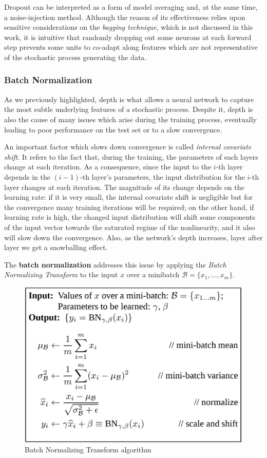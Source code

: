 \documentclass[a4paper, twoside]{article}
\begin{document}
        Dropout can be interpreted as a form of model averaging and, at the same time, a noise-injection method. Although the reason of its effectiveness relies upon sensitive considerations on the \textit{bagging technique}, which is not discussed in this work, it is intuitive that randomly dropping out some neurons at each forward step prevents some units to co-adapt along features which are not representative of the stochastic process generating the data.


        \subsubsection{Batch Normalization}

        As we previously highlighted, depth is what allows a neural network to capture the most subtle underlying features of a stochastic process. Despite it, depth is also the cause of many issues which arise during the training process, eventually leading to poor performance on the test set or to a slow convergence.

        An important factor which slows down convergence is called \textit{internal covariate shift}. It refers to the fact that, during the training, the parameters of each layers change at each iteration. As a consequence, since the input to the $i$-th layer depends in the $(i-1)$-th layer's parameters, the input distribution for the $i$-th layer changes at each iteration. The magnitude of its change depends on the learning rate: if it is very small, the internal covariate shift is negligible but for the convergence many training iterations will be required; on the other hand, if learning rate is high, the changed input distribution will shift some components of the input vector towards the saturated regime of the nonlinearity, and it also will slow down the convergence. Also, as the network's depth increases, layer after layer we get a snowballing effect.

        The \textbf{batch normalization} addresses this issue by applying the \textit{Batch Normalizing Transform} to the input $x$ over a minibatch $\mathcal{B} = \{ x_1, \dots , x_m \}$.

        \begin{figure}[H]
            \centering
            \includegraphics[width=0.75\linewidth]{batch_normalization.png}
            \caption{Batch Normalizing Transform algorithm}
        \end{figure}
\end{document}
